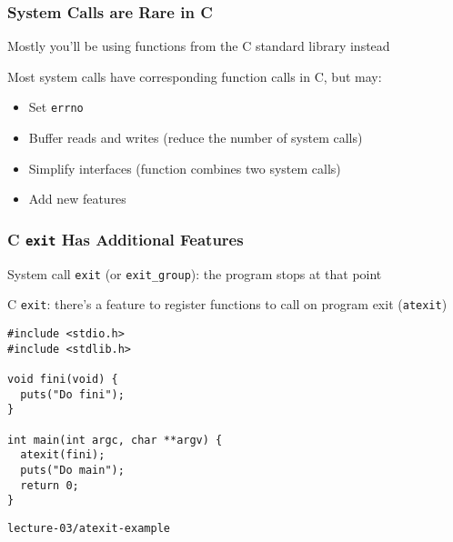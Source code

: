   \begin{frame}
    \frametitle{System Calls are Rare in C}

    Mostly you'll be using functions from the C standard library instead

    \vspace{2em}

    Most system calls have corresponding function calls in C, but may:
    \begin{itemize}
      \item Set \texttt{errno}
      \item Buffer reads and writes (reduce the number of system calls)
      \item Simplify interfaces (function combines two system calls)
      \item Add new features
    \end{itemize}
  \end{frame}

  \begin{frame}[fragile]
    \frametitle{C \texttt{exit} Has Additional Features}

    System call \texttt{exit} (or \texttt{exit\_group}): the program
    stops at that point

    \vspace{1em}

    C \texttt{exit}: there's a feature to register functions to call
    on program exit (\texttt{atexit})

    \vspace{1em}

    \begin{lstlisting}[xleftmargin=2em]
#include <stdio.h>
#include <stdlib.h>

void fini(void) {
  puts("Do fini");
}

int main(int argc, char **argv) {
  atexit(fini);
  puts("Do main");
  return 0;
}
    \end{lstlisting}
    \vspace{-1em}
    \begin{flushright}
      \lstinline|lecture-03/atexit-example|
    \end{flushright}
  \end{frame}

